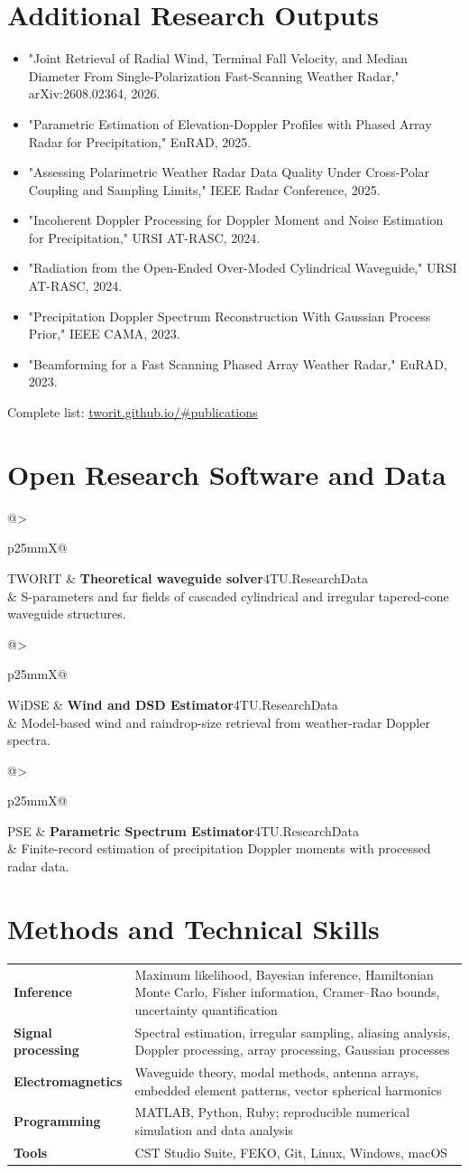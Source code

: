 \documentclass[10pt,a4paper]{article}
\makeatletter
\newcommand{\entry}[4]{\begin{tabularx}{\linewidth}{@{}>{\raggedright\arraybackslash}p{25mm}X@{}}\color{muted}\small #1 & \textbf{#2}\hfill{\small\color{muted}#3}\\ & #4\end{tabularx}\vspace{1.5pt}}
\makeatother
\begin{document}
\section{Additional Research Outputs}
\begin{itemize}
\item "Joint Retrieval of Radial Wind, Terminal Fall Velocity, and Median Diameter From Single-Polarization Fast-Scanning Weather Radar," arXiv:2608.02364, 2026.
\item "Parametric Estimation of Elevation-Doppler Profiles with Phased Array Radar for Precipitation," EuRAD, 2025.
\item "Assessing Polarimetric Weather Radar Data Quality Under Cross-Polar Coupling and Sampling Limits," IEEE Radar Conference, 2025.
\item "Incoherent Doppler Processing for Doppler Moment and Noise Estimation for Precipitation," URSI AT-RASC, 2024.
\item "Radiation from the Open-Ended Over-Moded Cylindrical Waveguide," URSI AT-RASC, 2024.
\item "Precipitation Doppler Spectrum Reconstruction With Gaussian Process Prior," IEEE CAMA, 2023.
\item "Beamforming for a Fast Scanning Phased Array Weather Radar," EuRAD, 2023.
\end{itemize}
{\small Complete list: \href{https://tworit.github.io/\#publications}{tworit.github.io/\#publications}}

\section{Open Research Software and Data}
\entry{TWORIT}{Theoretical waveguide solver}{4TU.ResearchData}{S-parameters and far fields of cascaded cylindrical and irregular tapered-cone waveguide structures.}
\entry{WiDSE}{Wind and DSD Estimator}{4TU.ResearchData}{Model-based wind and raindrop-size retrieval from weather-radar Doppler spectra.}
\entry{PSE}{Parametric Spectrum Estimator}{4TU.ResearchData}{Finite-record estimation of precipitation Doppler moments with processed radar data.}

\section{Methods and Technical Skills}
\begin{tabularx}{\linewidth}{@{}>{\bfseries\color{clay}}p{35mm}X@{}}
Inference & Maximum likelihood, Bayesian inference, Hamiltonian Monte Carlo, Fisher information, Cramer--Rao bounds, uncertainty quantification\\
Signal processing & Spectral estimation, irregular sampling, aliasing analysis, Doppler processing, array processing, Gaussian processes\\
Electromagnetics & Waveguide theory, modal methods, antenna arrays, embedded element patterns, vector spherical harmonics\\
Programming & MATLAB, Python, Ruby; reproducible numerical simulation and data analysis\\
Tools & CST Studio Suite, FEKO, Git, Linux, Windows, macOS
\end{tabularx}
\end{document}
